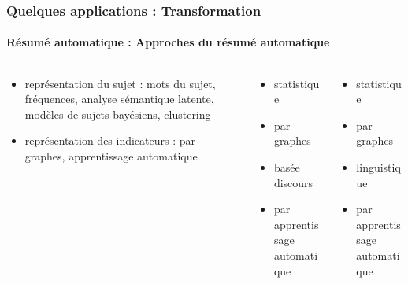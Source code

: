 \documentclass[xcolor=table]{beamer}
\begin{document}
\begin{frame}
	\frametitle{Quelques applications : Transformation}
	\framesubtitle{Résumé automatique : Approches du résumé automatique}
	\begin{columns}
		\begin{column}{0.32\textwidth}
			\begin{block}{\scriptsize\bfseries\cite{12-nenkova-mckeown}}
				\begin{itemize}
					\item représentation du sujet 
					:
					mots du sujet,
					fréquences, 
					analyse sémantique latente, 
					modèles de sujets bayésiens,
					clustering
					\item représentation des indicateurs : 
					par graphes, 
					apprentissage automatique
				\end{itemize}
			\end{block}
		\end{column}
		\begin{column}{0.3\textwidth}
			\begin{block}{\scriptsize\bfseries\cite{12-lloret-palomar}}
				\begin{itemize}
					\item statistique 
					\item par graphes
					\item basée discours
					\item par apprentissage automatique
				\end{itemize}
			\end{block}
		\end{column}
		\begin{column}{0.28\textwidth}
			\begin{block}{\scriptsize\bfseries\cite{19-aries-al}}
				\begin{itemize}
					\item statistique 
					\item par graphes
					\item linguistique 
					\item par apprentissage automatique
				\end{itemize}
			\end{block}
		\end{column}
	\end{columns}
\end{frame}
\end{document}
